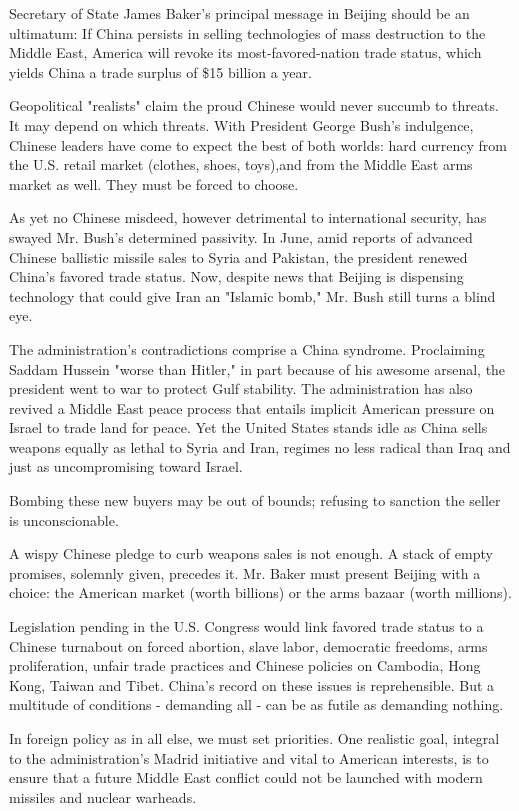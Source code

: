 Secretary of State James Baker's principal message in Beijing should be
an ultimatum: If China persists in selling technologies of mass
destruction to the Middle East, America will revoke its
most-favored-nation trade status, which yields China a trade surplus of
\$15 billion a year.

Geopolitical "realists" claim the proud Chinese would never succumb to
threats. It may depend on which threats. With President George Bush's
indulgence, Chinese leaders have come to expect the best of both worlds:
hard currency from the U.S. retail market (clothes, shoes, toys),and
from the Middle East arms market as well. They must be forced to choose.

As yet no Chinese misdeed, however detrimental to international
security, has swayed Mr. Bush's determined passivity. In June, amid
reports of advanced Chinese ballistic missile sales to Syria and
Pakistan, the president renewed China's favored trade status. Now,
despite news that Beijing is dispensing technology that could give Iran
an "Islamic bomb," Mr. Bush still turns a blind eye.

The administration's contradictions comprise a China syndrome.
Proclaiming Saddam Hussein "worse than Hitler," in part because of his
awesome arsenal, the president went to war to protect Gulf stability.
The administration has also revived a Middle East peace process that
entails implicit American pressure on Israel to trade land for peace.
Yet the United States stands idle as China sells weapons equally as
lethal to Syria and Iran, regimes no less radical than Iraq and just as
uncompromising toward Israel.

Bombing these new buyers may be out of bounds; refusing to sanction the
seller is unconscionable.

A wispy Chinese pledge to curb weapons sales is not enough. A stack of
empty promises, solemnly given, precedes it. Mr. Baker must present
Beijing with a choice: the American market (worth billions) or the arms
bazaar (worth millions).

Legislation pending in the U.S. Congress would link favored trade status
to a Chinese turnabout on forced abortion, slave labor, democratic
freedoms, arms proliferation, unfair trade practices and Chinese
policies on Cambodia, Hong Kong, Taiwan and Tibet. China's record on
these issues is reprehensible. But a multitude of conditions - demanding
all - can be as futile as demanding nothing.

In foreign policy as in all else, we must set priorities. One realistic
goal, integral to the administration's Madrid initiative and vital to
American interests, is to ensure that a future Middle East conflict
could not be launched with modern missiles and nuclear warheads.

